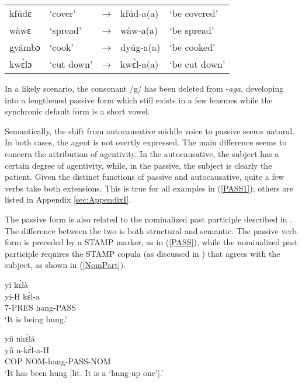 \begin{exe} \ex \label{PASS1}
\begin{tabular}{lllll}
kfúdɛ & `cover' & → & kfúd-a(a) & `be covered' \\
wàwɛ & `spread' & → & wàw-a(a) & `be spread' \\
gyámbɔ & `cook' & → & dyúg-a(a) & `be cooked' \\
kwɛ̀lɔ & `cut down' & → & kwɛ̀l-a(a) & `be cut down' \\
\end{tabular}
\end{exe} 

\noindent In a likely scenario, the consonant /g/ has been deleted from -{\itshape aga}, developing into a lengthened passive form which still exists in a few lexemes while the synchronic default form is a short vowel.

Semantically, the shift from autocausative middle voice to passive seems natural. In both cases, the agent is not overtly expressed. The main difference seems to concern the attribution of agentivity. In the autocausative, the subject has a certain degree of agentivity, while, in the passive, the subject is clearly the patient.  Given the distinct functions of passive and autocausative, quite a few verbs take both extensions. This is true for all examples in (\ref{PASS1}); others are listed in Appendix \ref{sec:AppendixI}.

The passive form is also related to the nominalized past participle described in . The difference between the two  is both structural and semantic. The passive verb form is preceded by a STAMP marker, as in (\ref{PASS}), while the nominalized past participle requires the STAMP copula (as discussed in ) that agrees with the subject, as shown in (\ref{NomPart}). 

\begin{exe}
\ex\label{PASS}
 \glll yí kɛ̀là  \\
	yi-H kɛ̀l-a \\
         7-PRES hang-PASS  \\
    \trans `It is being hung.'
\end {exe}

\begin{exe}
\ex\label{NomPart}
 \glll yíì nkɛ̀lá  \\
         yíì n-kɛ̀l-a-H \\
	COP NOM-hang-PASS-NOM \\
    \trans `It has been hung [lit. It is a `hung-up one'].'
\end {exe}

